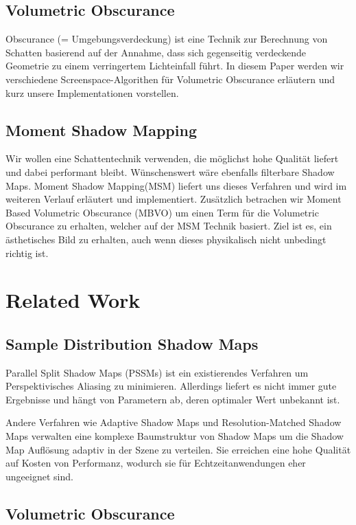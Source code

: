 \documentclass[runningheaders,a4paper]{llncs}
\begin{document}
\subsection{Volumetric Obscurance}
Obscurance (= Umgebungsverdeckung) ist eine Technik zur Berechnung von Schatten basierend auf der Annahme,
dass sich gegenseitig verdeckende Geometrie zu einem verringertem Lichteinfall führt. In diesem Paper werden
wir verschiedene Screenspace-Algorithen für Volumetric Obscurance erläutern und kurz unsere Implementationen vorstellen.


\subsection{Moment Shadow Mapping}
Wir wollen eine Schattentechnik verwenden, die möglichst hohe Qualität liefert und dabei performant bleibt. Wünschenswert wäre ebenfalls filterbare Shadow Maps.
Moment Shadow Mapping(MSM) liefert uns dieses Verfahren und wird im weiteren Verlauf erläutert und implementiert. 
Zusätzlich betrachen wir Moment Based Volumetric Obscurance (MBVO) um einen Term für die Volumetric Obscurance zu erhalten, welcher auf der MSM Technik basiert. Ziel ist es, ein ästhetisches Bild zu erhalten, auch wenn dieses physikalisch nicht unbedingt richtig ist.

\section{Related Work}

\subsection{Sample Distribution Shadow Maps}

Parallel Split Shadow Maps (PSSMs) \cite{pssm} ist ein existierendes Verfahren um Perspektivisches Aliasing zu minimieren.
Allerdings liefert es nicht immer gute Ergebnisse und hängt von Parametern ab, deren optimaler Wert unbekannt ist.

Andere Verfahren wie Adaptive Shadow Maps \cite{asm} und Resolution-Matched Shadow Maps \cite{rmsm} verwalten eine komplexe Baumstruktur von Shadow Maps um die Shadow Map Auflösung adaptiv in der Szene zu verteilen.
Sie erreichen eine hohe Qualität auf Kosten von Performanz, wodurch sie für Echtzeitanwendungen eher ungeeignet sind.


\subsection{Volumetric Obscurance}
\end{document}
